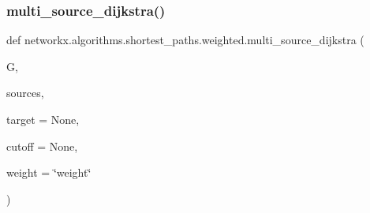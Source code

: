 \subsubsection{\texorpdfstring{multi\+\_\+source\+\_\+dijkstra()}{multi\_source\_dijkstra()}}
{\footnotesize\ttfamily def networkx.\+algorithms.\+shortest\+\_\+paths.\+weighted.\+multi\+\_\+source\+\_\+dijkstra (\begin{DoxyParamCaption}\item[{}]{G,  }\item[{}]{sources,  }\item[{}]{target = {\ttfamily None},  }\item[{}]{cutoff = {\ttfamily None},  }\item[{}]{weight = {\ttfamily \char`\"{}weight\char`\"{}} }\end{DoxyParamCaption})}


